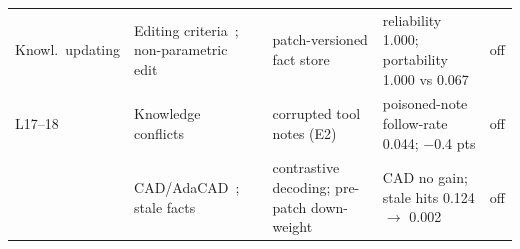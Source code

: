 \begin{table}[t]
\begin{tabular}{@{}L{1.8cm}L{4.55cm}L{4.55cm}L{5.0cm}l@{}}
Knowl.\ updating
 & Editing criteria~\cite{yao2023editingsurvey}; non-parametric edit~\cite{mitchell2022serac} & patch-versioned fact store & reliability 1.000; portability 1.000 vs 0.067 & off\\
L17--18~\cite{lim2026l17,lim2026l18}
 & Knowledge conflicts~\cite{wu2024clasheval,xie2024chameleon} & corrupted tool notes (E2) & poisoned-note follow-rate 0.044; $-$0.4 pts & off\\
 & CAD/AdaCAD~\cite{shi2024cad,wang2025adacad}; stale facts & contrastive decoding; pre-patch down-weight & CAD no gain; stale hits 0.124 $\rightarrow$ 0.002 & off\\
\bottomrule
\end{tabular}
\end{table}

